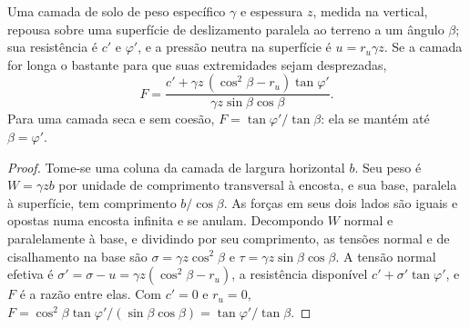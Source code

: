 \begin{proposition}\label{prop:b2:geological-hazards:infinite-slope}
Uma camada de solo de peso específico $\gamma$ e espessura $z$, medida na vertical, repousa sobre uma superfície
de deslizamento paralela ao terreno a um ângulo $\beta$; sua resistência é $c'$ e $\varphi'$, e a
pressão neutra na superfície é $u = r_u \gamma z$. Se a camada for longa o bastante para que suas extremidades sejam
desprezadas,
\begin{equation}
F = \frac{c' + \gamma z\,(\cos^2\beta - r_u)\tan\varphi'}{\gamma z \sin\beta\cos\beta}.
\label{eq:b2:geological-hazards:infinite-slope}
\end{equation}
Para uma camada seca e sem coesão, $F = \tan\varphi'/\tan\beta$: ela se mantém até $\beta = \varphi'$.
\end{proposition}

\begin{proof}
Tome-se uma coluna da camada de largura horizontal $b$. Seu peso é $W = \gamma z b$ por unidade de comprimento
transversal à encosta, e sua base, paralela à superfície, tem comprimento $b/\cos\beta$. As forças em
seus dois lados são iguais e opostas numa encosta infinita e se anulam. Decompondo $W$ normal e
paralelamente à base, e dividindo por seu comprimento, as tensões normal e de cisalhamento na base são
$\sigma = \gamma z\cos^2\beta$ e $\tau = \gamma z \sin\beta\cos\beta$. A tensão normal efetiva
é $\sigma' = \sigma - u = \gamma z(\cos^2\beta - r_u)$, a resistência disponível $c' +
\sigma'\tan\varphi'$, e $F$ é a razão entre elas. Com $c' = 0$ e $r_u = 0$, $F = \cos^2\beta
\tan\varphi'/(\sin\beta\cos\beta) = \tan\varphi'/\tan\beta$.
\end{proof}


